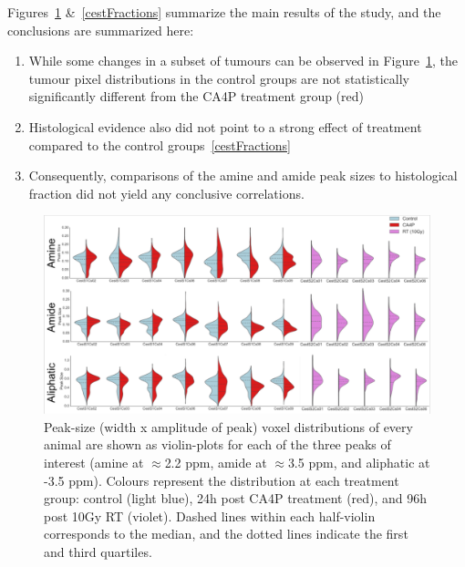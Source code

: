 Figures~\ref{mainCest} \&~\ref{cestFractions} summarize the main results of the study, and the conclusions are summarized here:

\begin{enumerate}
\item While some changes in a subset of tumours can be observed in Figure~\ref{mainCest}, the tumour pixel distributions in the control groups are not statistically significantly different from the CA4P treatment group (red)

\item Histological evidence also did not point to a strong effect of treatment compared to the control groups~\ref{cestFractions}

\item Consequently, comparisons of the amine and amide peak sizes to histological fraction did not yield any conclusive correlations.

\end{enumerate}

\begin{figure}[htbp]
\begin{center}
\includegraphics[width=\textwidth]{cest/cest-images/cest_Violinplots.png}
\caption{Peak-size (width x amplitude of peak) voxel distributions of every animal are shown as violin-plots for each of the three peaks of interest (amine at $\approx$2.2 ppm, amide at $\approx$3.5 ppm, and aliphatic at -3.5 ppm).
Colours represent the distribution at each treatment group: control (light blue), 24h post CA4P treatment (red), and 96h post 10Gy RT (violet).
Dashed lines within each half-violin corresponds to the median, and the dotted lines indicate the first and third quartiles.}
\label{mainCest}
\end{center}
\end{figure}

